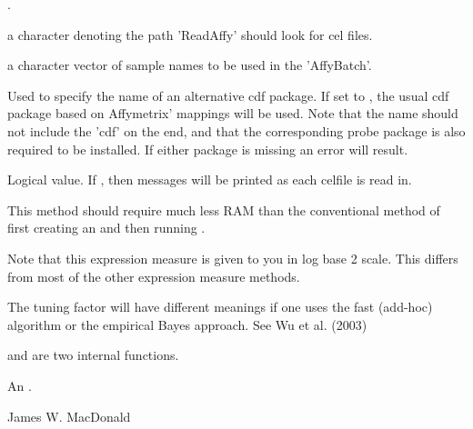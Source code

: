 \begin{Arguments}
\begin{ldescription}
\item[\code{minimum}] .
\item[\code{celfile.path}] a character denoting the path 'ReadAffy' should look for
cel files.
\item[\code{sampleNames}] a character vector of sample names to be used in the
'AffyBatch'.
\item[\code{cdfname}] Used to specify the name of an alternative cdf package. If set to
, the usual cdf package based on Affymetrix' mappings
will be used. Note that the name should not include the 'cdf' on
the end, and that the corresponding probe package is also required
to be installed. If either package is missing an error will
result.
\item[\code{read.verbose}] Logical value. If , then messages will be
printed as each celfile is read in.
\end{ldescription}
\end{Arguments}
\begin{Details}\relax
This method should require much less RAM than the conventional
method of first creating an  and then running
.

Note that this expression measure is given to you in log base 2
scale. This differs from most of the other expression measure
methods.

The tuning factor  will have different meanings if one uses
the fast (add-hoc) algorithm or the empirical Bayes approach. See Wu
et al. (2003)

 and  are two internal functions.
\end{Details}
\begin{Value}
An .
\end{Value}
\begin{Author}\relax
James W. MacDonald
\end{Author}

